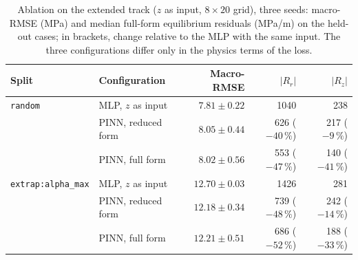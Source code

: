 \begin{table}[t]
\caption{Ablation on the extended track ($z$ as input, $8\times20$ grid), three seeds: macro-RMSE (MPa) and median full-form equilibrium residuals (MPa/m) on the held-out cases; in brackets, change relative to the MLP with the same input. The three configurations differ only in the physics terms of the loss.} %
\label{tab:ablation2d}
\centering\small
\begin{tabular}{@{}llrrr@{}}
\toprule
Split & Configuration & Macro-RMSE & $|R_r|$ & $|R_z|$ \\
\midrule
\texttt{random} & MLP, $z$ as input      & $7.81\pm0.22$  & 1040 & 238 \\
                & PINN, reduced form     & $8.05\pm0.44$  & 626 ($-40\,\%$) & 217 ($-9\,\%$) \\
                & PINN, full form        & $8.02\pm0.56$  & 553 ($-47\,\%$) & 140 ($-41\,\%$) \\
\addlinespace
\texttt{extrap:alpha\_max} & MLP, $z$ as input  & $12.70\pm0.03$ & 1426 & 281 \\
                           & PINN, reduced form & $12.18\pm0.34$ & 739 ($-48\,\%$) & 242 ($-14\,\%$) \\
                           & PINN, full form    & $12.21\pm0.51$ & 686 ($-52\,\%$) & 188 ($-33\,\%$) \\
\bottomrule
\end{tabular}
\end{table}

